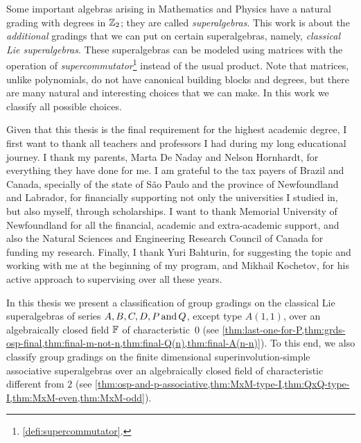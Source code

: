 \begin{prefatory}
Some important algebras arising in Mathematics and Physics have a natural grading with degrees in $\mathbb{Z}_2$; they are called \emph{superalgebras}. 
This work is about the \emph{additional} gradings that we can put on certain superalgebras, namely, \emph{classical Lie superalgebras}. 
These superalgebras can be modeled using matrices with the operation of \emph{supercommutator}\footnote{\cref{defi:supercommutator}.} instead of the usual product. 
Note that matrices, unlike polynomials, do not have canonical building blocks and degrees, but there are many natural and interesting choices that we can make. 
In this work we classify all possible choices. 

\acknowledgements%

Given that this thesis is the final requirement for the highest academic degree, I first want to thank all teachers and professors I had during my long educational journey. 
I thank my parents, Marta De Naday and Nelson Hornhardt, for everything they have done for me. 
I am grateful to the tax payers of Brazil and Canada, specially of the state of S\~ao Paulo and the province of Newfoundland and Labrador, for financially supporting not only the universities I studied in, but also myself, through scholarships. 
I want to thank Memorial University of Newfoundland for all the financial, academic and extra-academic support, and also the Natural Sciences and Engineering Research Council of Canada for funding my research. 
Finally, I thank Yuri Bahturin, for suggesting the topic and working with me at the beginning of my program, and Mikhail Kochetov, for his active approach to supervising over all these years. 


\contribution%

In this thesis we present a classification of group gradings on the classical Lie superalgebras of series $A, B, C, D, P \,\text{and}\, Q$, except type $A(1,1)$, over an algebraically closed field $\mathbb{F}$ of characteristic~$0$ (see \cref{thm:last-one-for-P,thm:grds-osp-final,thm:final-m-not-n,thm:final-Q(n),thm:final-A(n-n)}). 
To this end, we also classify group gradings on the finite dimensional superinvolution-simple associative superalgebras over an algebraically closed field of characteristic different from $2$ (see \cref{thm:osp-and-p-associative,thm:MxM-type-I,thm:QxQ-type-I,thm:MxM-even,thm:MxM-odd}). 


\end{prefatory}
